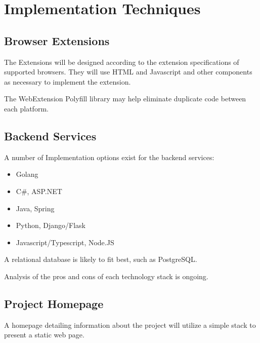\documentclass[proposal.tex]{subfiles}
\begin{document}
    
\section{Implementation Techniques}

\subsection{Browser Extensions}

The Extensions will be designed according to the extension specifications of supported browsers. They will use HTML and Javascript and other components as necessary to implement the extension. 

The WebExtension Polyfill library may help eliminate duplicate code between each platform.

\subsection{Backend Services}

A number of Implementation options exist for the backend services:

\begin{itemize}
    \item Golang 
    \item C\#, ASP.NET
    \item Java, Spring
    \item Python, Django/Flask
    \item Javascript/Typescript, Node.JS
\end{itemize}

A relational database is likely to fit best, such as PostgreSQL.

Analysis of the pros and cons of each technology stack is ongoing.


\subsection{Project Homepage}

A homepage detailing information about the project will utilize a simple stack to present a static web page.
\end{document}
